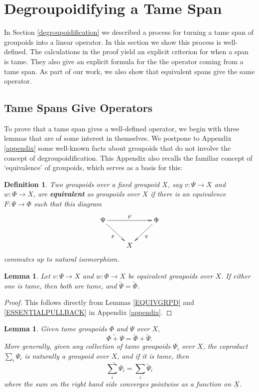 \documentclass{article}
\renewcommand{\to}{\rightarrow}
\newcommand{\maps}{\colon}
\renewcommand{\u}[1]{\underline{#1}}
\newtheorem{definition}[thm]{Definition}
\newtheorem{lemma}[thm]{Lemma}
\begin{document}
\section{Degroupoidifying a Tame Span}
\label{processes}

In Section \ref{degroupoidification} we described a process for
turning a tame span of groupoids into a linear operator.  In this
section we show this process is well-defined.  The calculations
in the proof yield an explicit criterion for when a span is tame.
They also give an explicit formula for the the operator coming from a
tame span.  As part of our work, we also show that equivalent spans
give the same operator.

\subsection{Tame Spans Give Operators}

To prove that a tame span gives a well-defined operator, we begin with
three lemmas that are of some interest in themselves.  We postpone to
Appendix \ref{appendix} some well-known facts about groupoids that do
not involve the concept of degroupoidification.  This Appendix also
recalls the familiar concept of `equivalence' of groupoids, which
serves as a basis for this:

\begin{definition}
Two groupoids over a fixed groupoid $X$, say $v \maps \Psi \to X$
and $w \maps \Phi \to X$, are {\bf equivalent} as groupoids 
over $X$ if there is an equivalence $F \maps \Psi \to \Phi$ 
such that this diagram
\[
\xymatrix{
\Psi \ar[rr]^{F} \ar[dr]_{p} && \Phi \ar[dl]^{q} \\
&X&
}
\]
commutes up to natural isomorphism.
\end{definition}

\begin{lemma}\label{vectorswelldefined}
Let $v \maps \Psi \to X$ and $w \maps \Phi \to X$ be equivalent
groupoids over $X$.  If either one is tame, then both are tame,
and $\utilde{\Psi} = \utilde{\Phi}$.
\end{lemma}

\begin{proof}
This follows directly from Lemmas \ref{EQUIVGRPD} and 
\ref{ESSENTIALPULLBACK} in Appendix \ref{appendix}.
\end{proof}

\begin{lemma}
\label{addvectors}
Given tame groupoids $\Phi$ and $\Psi$ over $X$,
\[\utilde{\Phi + \Psi} = \utilde{\Phi} + \utilde{\Psi}.\]
More generally, given any collection of tame groupoids $\Psi_i$ over $X$,
the coproduct $\sum_i \Psi_i$ is naturally a 
groupoid over $X$, and if it is tame, then
\[\utilde{\sum_i \Psi_i} = \sum_i \utilde{\Psi}_i \]
where the sum on the right hand side converges pointwise as
a function on $\u{X}$.
\end{lemma}
\end{document}

